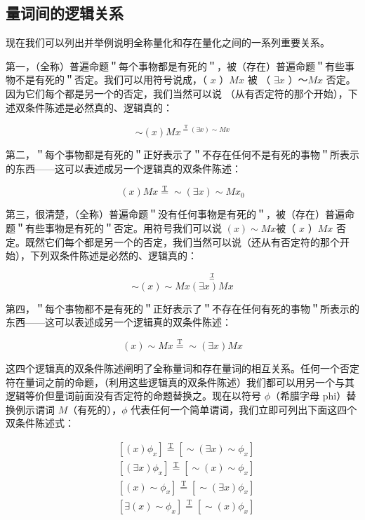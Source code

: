 \subsection{量词间的逻辑关系}

现在我们可以列出并举例说明全称量化和存在量化之间的一系列重要关系。

第一，（全称）普遍命题＂每个事物都是有死的＂，被（存在）普遍命题＂有些事物不是有死的＂否定。我们可以用符号说成，（ $x$ ）$M x$ 被 （ $\exists x$ ）～$M x$ 否定。因为它们每个都是另一个的否定，我们当然可以说 （从有否定符的那个开始），下述双条件陈述是必然真的、逻辑真的：

$$
\sim(x) M x \stackrel{\stackrel{\mathrm{~T}}{=}(\exists x) \sim M x}{ }
$$

第二，＂每个事物都是有死的＂正好表示了＂不存在任何不是有死的事物＂所表示的东西——这可以表述成另一个逻辑真的双条件陈述：

$$
(x) M x \stackrel{\mathrm{T}}{=} \sim(\exists x) \sim M x_{0}
$$

第三，很清楚，（全称）普遍命题＂没有任何事物是有死的＂，被（存在）普遍命题＂有些事物是有死的＂否定。用符号我们可以说 $(x) \sim M x$被（ $x$ ）$M x$ 否定。既然它们每个都是另一个的否定，我们当然可以说（还从有否定符的那个开始），下列双条件陈述是必然的、逻辑真的：

$$
\sim(x) \sim M x \stackrel{\stackrel{\mathrm{~T}}{=}}{(\exists x) M x}
$$

第四，＂每个事物都不是有死的＂正好表示了＂不存在任何有死的事物＂所表示的东西——这可以表述成另一个逻辑真的双条件陈述：

$$
(x) \sim M x \stackrel{\mathrm{T}}{=} \sim(\exists x) M x
$$

这四个逻辑真的双条件陈述阐明了全称量词和存在量词的相互关系。任何一个否定符在量词之前的命题，（利用这些逻辑真的双条件陈述）我们都可以用另一个与其逻辑等价但量词前面没有否定符的命题替换之。现在以符号 $\phi$（希腊字母 phi）替换例示谓词 $M$（有死的），$\phi$ 代表任何一个简单谓词，我们立即可列出下面这四个双条件陈述式：

$$
\begin{aligned}
& {\left[(x) \phi_{x}\right] \stackrel{\mathrm{T}}{=}\left[\sim(\exists x) \sim \phi_{x}\right]} \\
& {\left[(\exists x) \phi_{x}\right] \stackrel{\mathrm{T}}{=}\left[\sim(x) \sim \phi_{x}\right]} \\
& {\left[(x) \sim \phi_{x}\right] \stackrel{\mathrm{T}}{=}\left[\sim(\exists x) \phi_{x}\right]} \\
& {\left[\exists(x) \sim \phi_{x}\right] \stackrel{\mathrm{T}}{=}\left[\sim(x) \phi_{x}\right]}
\end{aligned}
$$

